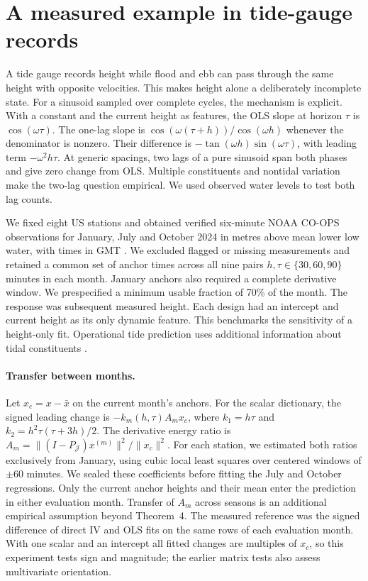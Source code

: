 \section{A measured example in tide-gauge records}
A tide gauge records height while flood and ebb can pass through the same height with opposite velocities. This makes height alone a deliberately incomplete state. For a sinusoid sampled over complete cycles, the mechanism is explicit. With a constant and the current height as features, the OLS slope at horizon $\tau$ is $\cos(\omega\tau)$. The one-lag slope is $\cos(\omega(\tau+h))/\cos(\omega h)$ whenever the denominator is nonzero. Their difference is $-\tan(\omega h)\sin(\omega\tau)$, with leading term $-\omega^2 h\tau$. At generic spacings, two lags of a pure sinusoid span both phases and give zero change from OLS. Multiple constituents and nontidal variation make the two-lag question empirical. We used observed water levels to test both lag counts.

We fixed eight US stations and obtained verified six-minute NOAA CO-OPS observations for January, July and October 2024 in metres above mean lower low water, with times in GMT \cite{noaa}. We excluded flagged or missing measurements and retained a common set of anchor times across all nine pairs $h,\tau\in\{30,60,90\}$ minutes in each month. January anchors also required a complete derivative window. We prespecified a minimum usable fraction of 70\% of the month. The response was subsequent measured height. Each design had an intercept and current height as its only dynamic feature. This benchmarks the sensitivity of a height-only fit. Operational tide prediction uses additional information about tidal constituents \cite{harmonics}.

\paragraph{Transfer between months.}
Let $x_c=x-\bar x$ on the current month's anchors. For the scalar dictionary, the signed leading change is $-k_m(h,\tau)A_m x_c$, where $k_1=h\tau$ and $k_2=h^2\tau(\tau+3h)/2$. The derivative energy ratio is $A_m=\|(I-P_{\mathcal J})x^{(m)}\|^2/\|x_c\|^2$. For each station, we estimated both ratios exclusively from January, using cubic local least squares over centered windows of $\pm60$ minutes. We sealed these coefficients before fitting the July and October regressions. Only the current anchor heights and their mean enter the prediction in either evaluation month. Transfer of $A_m$ across seasons is an additional empirical assumption beyond Theorem~4. The measured reference was the signed difference of direct IV and OLS fits on the same rows of each evaluation month. With one scalar and an intercept all fitted changes are multiples of $x_c$, so this experiment tests sign and magnitude; the earlier matrix tests also assess multivariate orientation.

